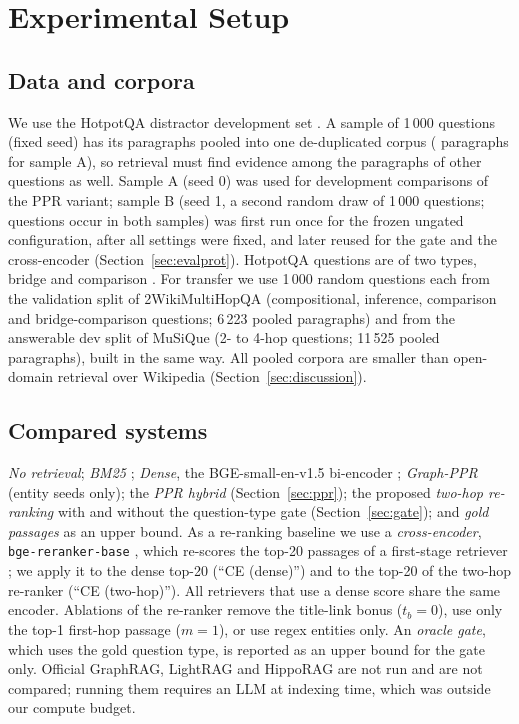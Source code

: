 \documentclass[a4paper,fleqn]{cas-sc}
\begin{document}
\section{Experimental Setup}\label{sec:setup}
\subsection{Data and corpora}
We use the HotpotQA distractor development set \citep{yang2018hotpotqa}. A sample of 1\,000 questions (fixed seed) has its paragraphs pooled into one de-duplicated corpus (\nPHotpotQA{} paragraphs for sample A), so retrieval must find evidence among the paragraphs of other questions as well. Sample A (seed 0) was used for development comparisons of the PPR variant; sample B (seed 1, a second random draw of 1\,000 questions; \nOverlapAB{} questions occur in both samples) was first run once for the frozen ungated configuration, after all settings were fixed, and later reused for the gate and the cross-encoder (Section~\ref{sec:evalprot}). HotpotQA questions are of two types, bridge and comparison \citep{yang2018hotpotqa}. For transfer we use 1\,000 random questions each from the validation split of 2WikiMultiHopQA \citep{ho2020twowiki} (compositional, inference, comparison and bridge-comparison questions; 6\,223 pooled paragraphs) and from the answerable dev split of MuSiQue \citep{trivedi2022musique} (2- to 4-hop questions; 11\,525 pooled paragraphs), built in the same way. All pooled corpora are smaller than open-domain retrieval over Wikipedia (Section~\ref{sec:discussion}).

\subsection{Compared systems}
\emph{No retrieval}; \emph{BM25} \citep{robertson2009bm25}; \emph{Dense}, the BGE-small-en-v1.5 bi-encoder \citep{xiao2023bge}; \emph{Graph-PPR} (entity seeds only); the \emph{PPR hybrid} (Section~\ref{sec:ppr}); the proposed \emph{two-hop re-ranking} with and without the question-type gate (Section~\ref{sec:gate}); and \emph{gold passages} as an upper bound. As a re-ranking baseline we use a \emph{cross-encoder}, \texttt{bge-reranker-base} \citep{xiao2023bge}, which re-scores the top-20 passages of a first-stage retriever \citep{nogueira2019rerank}; we apply it to the dense top-20 (``CE (dense)'') and to the top-20 of the two-hop re-ranker (``CE (two-hop)''). All retrievers that use a dense score share the same encoder. Ablations of the re-ranker remove the title-link bonus ($t_b=0$), use only the top-1 first-hop passage ($m=1$), or use regex entities only. An \emph{oracle gate}, which uses the gold question type, is reported as an upper bound for the gate only. Official GraphRAG, LightRAG and HippoRAG are not run and are not compared; running them requires an LLM at indexing time, which was outside our compute budget.
\end{document}
